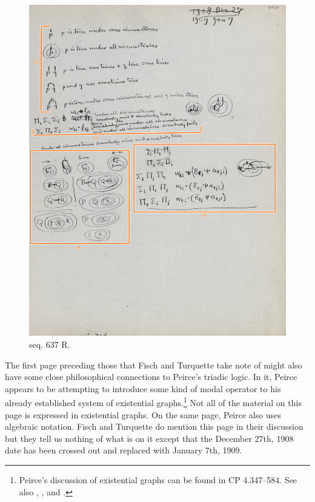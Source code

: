 \begin{figure}
\centering
\includegraphics[width=\textwidth]{images/seq637.jpeg}
\caption{seq. 637 R.}
\label{fig:seq637}
\end{figure}

The first page preceding those that Fisch and Turquette take note of might also have some close philosophical connections to Peirce's triadic logic. In it, Peirce appears to be attempting to introduce some kind of modal operator to his already established system of existential graphs.\footnote{Peirce's discussion of existential graphs can be found in CP 4.347--584. See also \cite{roberts_existential_2009}, \cite{shin_iconic_2002}, and \cite{hammer_semantics_1998}.} Not all of the material on this page is expressed in existential graphs. On the same page, Peirce also uses algebraic notation. Fisch and Turquette do mention this page in their discussion but they tell us nothing of what is on it except that the December 27th, 1908 date has been crossed out and replaced with January 7th, 1909.

